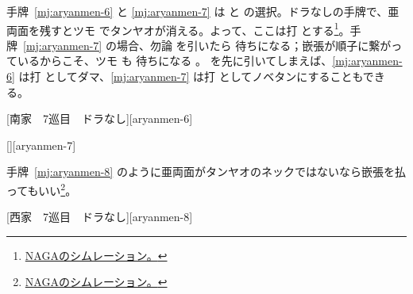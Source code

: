 \documentclass[../nankiru_main.tex]{subfiles}
\begin{document}
手牌~\ref{mj:aryanmen-6} と \ref{mj:aryanmen-7} は  と  の選択。ドラなしの手牌で、亜両面を残すとツモ  でタンヤオが消える。よって、ここは打  とする\footnote{\href{https://naga.dmv.nico/htmls/c6482cee4ed422c0cf95e75cb9c8ad9d60826065b1df3def92e785687ceaf68bv2_2.html?tw=1}{{NAGAのシムレーション。}}}。手牌~\ref{mj:aryanmen-7} の場合、勿論  を引いたら  待ちになる；嵌張が順子に繋がっているからこそ、ツモ  も  待ちになる \citep[][p.~105]{uzaku-haikouritsu}。 を先に引いてしまえば、\ref{mj:aryanmen-6} は打  としてダマ、\ref{mj:aryanmen-7} は打  としてノベタンにすることもできる。

[南家　7巡目　ドラなし][aryanmen-6]

[][aryanmen-7]

手牌~\ref{mj:aryanmen-8} のように亜両面がタンヤオのネックではないなら嵌張を払ってもいい\footnote{\href{https://naga.dmv.nico/htmls/c6482cee4ed422c0cf95e75cb9c8ad9d60826065b1df3def92e785687ceaf68bv2_2.html?tw=2}{{NAGAのシムレーション。}}}。

[西家　7巡目　ドラなし][aryanmen-8]

%
%
%
%
%
%
\end{document}
